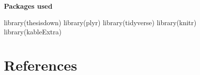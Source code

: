 \documentclass[12pt,twoside]{reedthesis}
\newenvironment{Shaded}{\begin{snugshade}}{\end{snugshade}}
\newcommand{\FunctionTok}[1]{\textcolor[rgb]{0.00,0.00,0.00}{#1}}
\newcommand{\NormalTok}[1]{#1}
\begin{document}
\textbf{Packages used}
\begin{Shaded}
\begin{Highlighting}[]
\FunctionTok{library}\NormalTok{(thesisdown)}
\FunctionTok{library}\NormalTok{(plyr)}
\FunctionTok{library}\NormalTok{(tidyverse) }
\FunctionTok{library}\NormalTok{(knitr)}
\FunctionTok{library}\NormalTok{(kableExtra)}
\end{Highlighting}
\end{Shaded}
\backmatter

\hypertarget{references}{%
\chapter*{References}\label{references}}


\noindent

\setlength{\parindent}{-0.20in}
\setlength{\leftskip}{0.20in}
\setlength{\parskip}{8pt}
\end{document}
